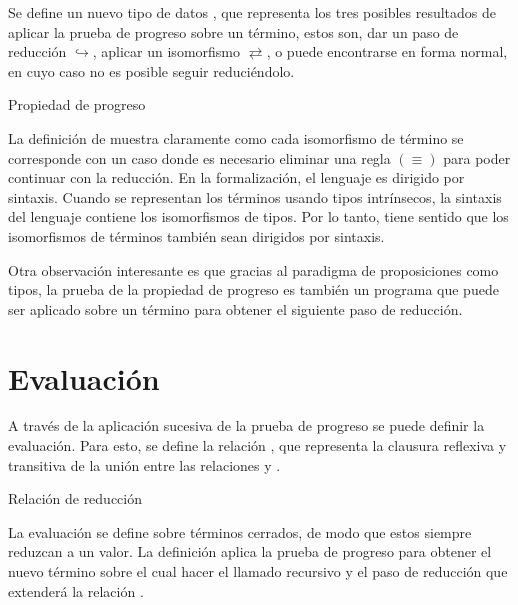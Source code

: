 \documentclass[]{report}
\begin{document}
	Se define un nuevo tipo de datos , que representa los tres posibles resultados de aplicar la prueba de progreso sobre un término, estos son, dar un paso de reducción $\hookrightarrow$, aplicar un isomorfismo $\rightleftarrows$, o puede encontrarse en forma normal, en cuyo caso no es posible seguir reduciéndolo.
	
	\begin{codigo}
		Propiedad de progreso
	\end{codigo}
	
	La definición de  muestra claramente como cada isomorfismo de término se corresponde con un caso donde es necesario eliminar una regla $(\equiv)$ para poder continuar con la reducción.
	En la formalización, el lenguaje es dirigido por sintaxis.
	Cuando se representan los términos usando tipos intrínsecos, la sintaxis del lenguaje contiene los isomorfismos de tipos.
	Por lo tanto, tiene sentido que los isomorfismos de términos también sean dirigidos por sintaxis.
	
	Otra observación interesante es que gracias al paradigma de proposiciones como tipos, la prueba de la propiedad de progreso es también un programa que puede ser aplicado sobre un término para obtener el siguiente paso de reducción.
	
	\section{Evaluación}
	
	A través de la aplicación sucesiva de la prueba de progreso se puede definir la evaluación.
	Para esto, se define la relación \AgdaDatatype{$\_\rightsquigarrow\_$}, que representa la clausura reflexiva y transitiva de la unión entre las relaciones \AgdaDatatype{$\_\hookrightarrow\_$} y \AgdaDatatype{$\_\rightleftarrows\_$}.
	
	\begin{codigo}
		Relación de reducción
		\ExecuteMetaData[code/eval.tex]{relation}
	\end{codigo}
	
	La evaluación se define sobre términos cerrados, de modo que estos siempre reduzcan a un valor.
	La definición aplica la prueba de progreso para obtener el nuevo término sobre el cual hacer el llamado recursivo y el paso de reducción que extenderá la relación \AgdaDatatype{$\_\rightsquigarrow\_$}.
	
\end{document}
